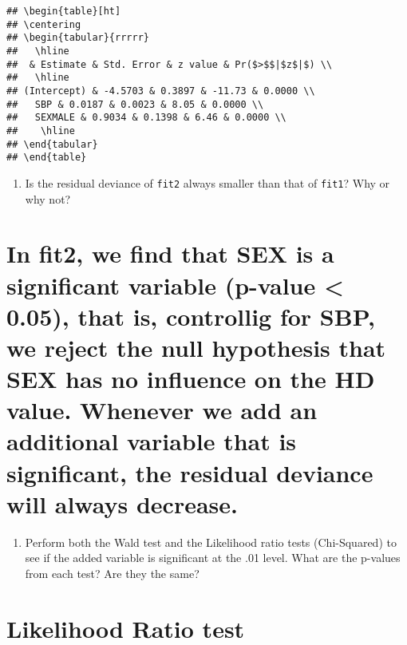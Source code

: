 \documentclass[]{article}
\providecommand{\tightlist}{%
  \setlength{\itemsep}{0pt}\setlength{\parskip}{0pt}}
\begin{document}
\begin{verbatim}
## \begin{table}[ht]
## \centering
## \begin{tabular}{rrrrr}
##   \hline
##  & Estimate & Std. Error & z value & Pr($>$$|$z$|$) \\ 
##   \hline
## (Intercept) & -4.5703 & 0.3897 & -11.73 & 0.0000 \\ 
##   SBP & 0.0187 & 0.0023 & 8.05 & 0.0000 \\ 
##   SEXMALE & 0.9034 & 0.1398 & 6.46 & 0.0000 \\ 
##    \hline
## \end{tabular}
## \end{table}
\end{verbatim}

\begin{enumerate}
\def\labelenumi{\roman{enumi}.}
\setcounter{enumi}{1}
\tightlist
\item
  Is the residual deviance of \texttt{fit2} always smaller than that of
  \texttt{fit1}? Why or why not?
\end{enumerate}

\section{In fit2, we find that SEX is a significant variable (p-value
\textless{} 0.05), that is, controllig for SBP, we reject the null
hypothesis that SEX has no influence on the HD value. Whenever we add an
additional variable that is significant, the residual deviance will
always
decrease.}\label{in-fit2-we-find-that-sex-is-a-significant-variable-p-value-0.05-that-is-controllig-for-sbp-we-reject-the-null-hypothesis-that-sex-has-no-influence-on-the-hd-value.-whenever-we-add-an-additional-variable-that-is-significant-the-residual-deviance-will-always-decrease.}

\begin{enumerate}
\def\labelenumi{\roman{enumi}.}
\setcounter{enumi}{2}
\tightlist
\item
  Perform both the Wald test and the Likelihood ratio tests
  (Chi-Squared) to see if the added variable is significant at the .01
  level. What are the p-values from each test? Are they the same?
\end{enumerate}

\section{Likelihood Ratio test}\label{likelihood-ratio-test}
\end{document}
